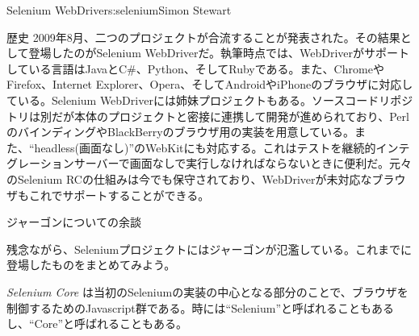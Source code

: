 \begin{aosachapter}{Selenium WebDriver}{s:selenium}{Simon Stewart}
\begin{aosasect1}{歴史}
2009年8月、二つのプロジェクトが合流することが発表された。その結果として登場したのがSelenium WebDriverだ。執筆時点では、WebDriverがサポートしている言語はJavaとC\#、Python、そしてRubyである。また、ChromeやFirefox、Internet Explorer、Opera、そしてAndroidやiPhoneのブラウザに対応している。Selenium WebDriverには姉妹プロジェクトもある。ソースコードリポジトリは別だが本体のプロジェクトと密接に連携して開発が進められており、PerlのバインディングやBlackBerryのブラウザ用の実装を用意している。また、``headless(画面なし)''のWebKitにも対応する。これはテストを継続的インテグレーションサーバーで画面なしで実行しなければならないときに便利だ。元々のSelenium RCの仕組みは今でも保守されており、WebDriverが未対応なブラウザもこれでサポートすることができる。

\end{aosasect1}

\begin{aosasect1}{ジャーゴンについての余談}

残念ながら、Seleniumプロジェクトにはジャーゴンが氾濫している。これまでに登場したものをまとめてみよう。

\begin{aosaitemize}

  \item \emph{Selenium Core} は当初のSeleniumの実装の中心となる部分のことで、ブラウザを制御するためのJavascript群である。時には``Selenium''と呼ばれることもあるし、``Core''と呼ばれることもある。


\end{aosaitemize}
\end{aosasect1}
\end{aosachapter}
